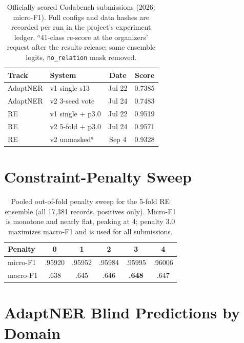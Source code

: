 \documentclass[11pt]{article}
\begin{document}
\begin{table}[H]
\centering
\small
\begin{tabular}{llcc}
\toprule
\textbf{Track} & \textbf{System} & \textbf{Date} & \textbf{Score} \\
\midrule
AdaptNER & v1 single s13 & Jul 22 & 0.7385 \\
AdaptNER & v2 3-seed vote & Jul 24 & 0.7483 \\
RE & v1 single + p3.0 & Jul 22 & 0.9519 \\
RE & v2 5-fold + p3.0 & Jul 24 & 0.9571 \\
RE & v2 unmasked$^{a}$ & Sep 4 & 0.9328 \\
\bottomrule
\end{tabular}
\caption{Officially scored Codabench submissions (2026; micro-F1). Full
configs and data hashes are recorded per run in the project's experiment
ledger. $^{a}$41-class re-score at the organizers' request after the
results release; same ensemble logits, \texttt{no\_relation} mask
removed.}
\label{tab:manifest}
\end{table}

\section{Constraint-Penalty Sweep}
\label{app:sweep}

\begin{table}[H]
\centering
\small
\setlength{\tabcolsep}{3.5pt}
\begin{tabular}{lccccc}
\toprule
\textbf{Penalty} & 0 & 1 & 2 & 3 & 4 \\
\midrule
micro-F1 & .95920 & .95952 & .95984 & .95995 & .96006 \\
macro-F1 & .638 & .645 & .646 & \textbf{.648} & .647 \\
\bottomrule
\end{tabular}
\caption{Pooled out-of-fold penalty sweep for the 5-fold RE ensemble (all
17,381 records, positives only). Micro-F1 is monotone and nearly flat,
peaking at 4; penalty 3.0 maximizes macro-F1 and is used for all
submissions.}
\label{tab:sweep}
\end{table}

\section{AdaptNER Blind Predictions by Domain}
\label{app:domains}
\end{document}
